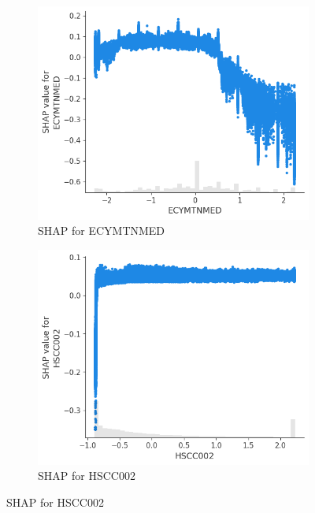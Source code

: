 \documentclass{article}
\begin{document}
\begin{figure}[H]
  \centering
  \begin{subfigure}{0.45\textwidth}
    \includegraphics[width=\linewidth]{figures/ECYMTNMED_SHAP.png}
    \caption{SHAP for ECYMTNMED}
  \end{subfigure}
  \hfill
  \begin{subfigure}{0.45\textwidth}
    \includegraphics[width=\linewidth]{figures/HSCC002_SHAP.png}
    \caption{SHAP for HSCC002}
  \end{subfigure}

  \vspace{0.5cm}


\end{figure}
\end{document}
